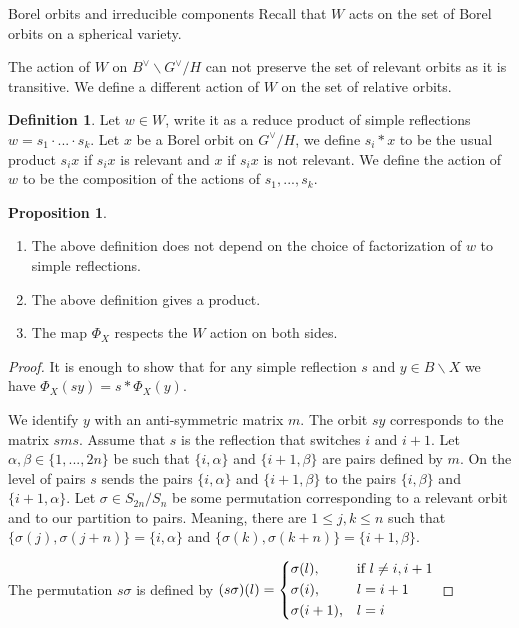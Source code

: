 \documentclass[12pt]{article}
\newcommand{\<}{\langle}
\renewcommand{\>}{\rangle}
\theoremstyle{plain}
\theoremstyle{definition}
\newtheorem{prop}[theorem]{Proposition}
\newtheorem{defn}[theorem]{Definition}
\begin{document}
\begin{section}{Borel orbits and irreducible components}
Recall that $W$ acts on the set of Borel orbits on a spherical variety.

The action of $W$ on $B^\vee\backslash G^\vee/H$ can not preserve the set of relevant orbits as it is transitive. We define a different action of $W$ on the set of relative orbits. 

\begin{defn}
    Let $w\in W$, write it as a reduce product of simple reflections $w=s_1\cdot...\cdot s_k$. Let $x$ be a Borel orbit on $G^\vee/H$, we define $s_i*x$ to be the usual product $s_ix$ if $s_ix$ is relevant and $x$ if $s_ix$ is not relevant. We define the action of $w$ to be the composition of the actions of $s_1,...,s_k$.
\end{defn}

\begin{prop}\label{group map}
\begin{enumerate}
    \item The above definition does not depend on the choice of factorization of $w$ to simple reflections.
    \item The above definition gives a product.
    \item The map $\Phi_X$ respects the $W$ action on both sides.
    
\end{enumerate} 
\end{prop}

\begin{proof}
    It is enough to show that for any simple reflection $s$ and $y\in B\backslash X$ we have $\Phi_X(sy)=s*\Phi_X(y)$. 

     We identify $y$ with an anti-symmetric matrix $m$. The orbit $sy$ corresponds to the matrix $sms$. Assume that $s$ is the reflection that switches $i$ and $i+1$. Let $\alpha,\beta\in \{1,...,2n\}$ be such that $\{i,\alpha\}$ and $\{i+1,\beta\}$ are pairs defined by $m$. On the level of pairs $s$ sends the pairs $\{i,\alpha\}$ and $\{i+1,\beta\}$ to the pairs $\{i,\beta\}$ and $\{i+1,\alpha\}$. Let $\sigma\in S_{2n}/S_n$ be some permutation corresponding to a relevant orbit and to our partition to pairs. Meaning, there are $1\leq j,k\leq n$ such that $\{\sigma(j),\sigma(j+n)\}=\{i,\alpha\}$ and $\{\sigma(k),\sigma(k+n)\}=\{i+1,\beta\}$. 
    
    The permutation $s\sigma$ is defined by $(s\sigma)(l)=\begin{dcases}
    \sigma(l),& \text{if } l\neq i,i+1\\
    \sigma(i),              & l=i+1\\
    \sigma(i+1), & l=i
\end{dcases}$


\end{proof}
\end{section}
\end{document}

